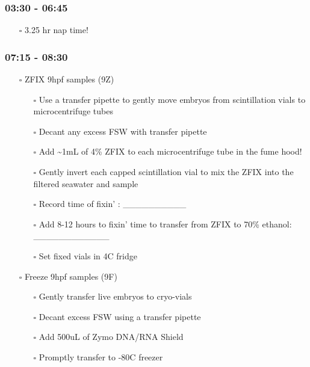 \documentclass[
  letterpaper,
  DIV=11,
  numbers=noendperiod]{scrartcl}
\providecommand{\tightlist}{%
  \setlength{\itemsep}{0pt}\setlength{\parskip}{0pt}}\usepackage{longtable,booktabs,array}
\begin{document}
\hypertarget{section-7}{%
\subsubsection{03:30 - 06:45}\label{section-7}}

\begin{itemize}
\tightlist
\item[$\square$]
  3.25 hr nap time!
\end{itemize}

\hypertarget{section-8}{%
\subsubsection{07:15 - 08:30}\label{section-8}}

\begin{itemize}
\item[$\square$]
  ZFIX 9hpf samples (9Z)

  \begin{itemize}
  \tightlist
  \item[$\square$]
    Use a transfer pipette to gently move embryos from scintillation
    vials to microcentrifuge tubes
  \item[$\square$]
    Decant any excess FSW with transfer pipette
  \item[$\square$]
    Add \textasciitilde1mL of 4\% ZFIX to each microcentrifuge tube in
    the fume hood!
  \item[$\square$]
    Gently invert each capped scintillation vial to mix the ZFIX into
    the filtered seawater and sample
  \item[$\square$]
    Record time of fixin' : \_\_\_\_\_\_\_\_\_\_
  \item[$\square$]
    Add 8-12 hours to fixin' time to transfer from ZFIX to 70\% ethanol:
    \_\_\_\_\_\_\_\_\_\_\_\_
  \item[$\square$]
    Set fixed vials in 4C fridge
  \end{itemize}
\item[$\square$]
  Freeze 9hpf samples (9F)

  \begin{itemize}
  \item[$\square$]
    Gently transfer live embryos to cryo-vials
  \item[$\square$]
    Decant excess FSW using a transfer pipette
  \item[$\square$]
    Add 500uL of Zymo DNA/RNA Shield
  \item[$\square$]
    Promptly transfer to -80C freezer
  \end{itemize}
\end{itemize}
\end{document}
